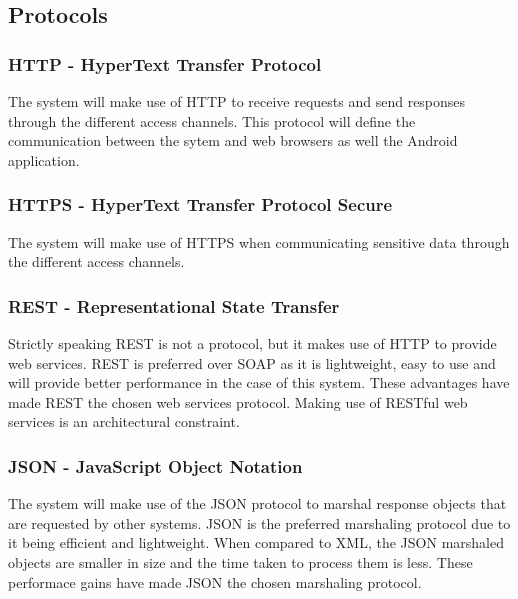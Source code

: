 \topmargin=-0.45in
\evensidemargin=0in
\oddsidemargin=0in
\textwidth=6.5in
\textheight=9.0in
\headsep=0.25in

\linespread{1.1} %

\subsection{Protocols}

\subsubsection{HTTP - HyperText Transfer Protocol}

The system will make use of HTTP to receive requests and send responses through the different access channels. This protocol will define the communication
between the sytem and web browsers as well the Android application.

\subsubsection{HTTPS - HyperText Transfer Protocol Secure}

The system will make use of HTTPS when communicating sensitive data through the different access channels.

\subsubsection{REST - Representational State Transfer}

Strictly speaking REST is not a protocol, but it makes use of HTTP to provide web services. REST is preferred over SOAP as it is lightweight, easy to use and will provide
better performance in the case of this system. These advantages have made REST the chosen web services protocol. Making use of RESTful web services is an architectural constraint.

\subsubsection{JSON - JavaScript Object Notation}

The system will make use of the JSON protocol to marshal response objects that are requested by other systems. JSON is the preferred
marshaling protocol due to it being efficient and lightweight. When compared to XML, the JSON marshaled objects are smaller in size
and the time taken to process them is less. These performace gains have made JSON the chosen marshaling protocol.

